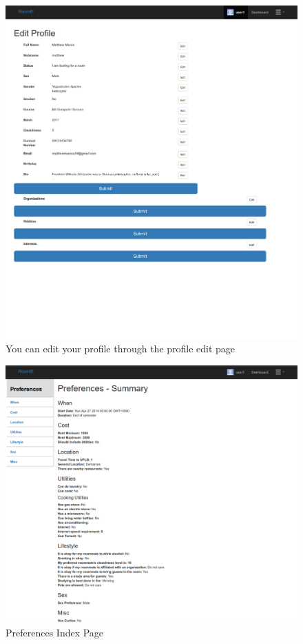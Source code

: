 \documentclass[journal]{IEEEtran}
\begin{document}
    \begin{figure}
        \centering
            \includegraphics[scale=0.17]{profileedit.png}
            \caption{You can edit your profile through the profile edit page}
            \label{Profile Edit Page}
    \end{figure}
    \begin{figure}
        \centering
            \includegraphics[scale=0.17]{prefindex.png}
            \caption{Preferences Index Page}
            \label{Preferences Index Page}
    \end{figure}
\end{document}
